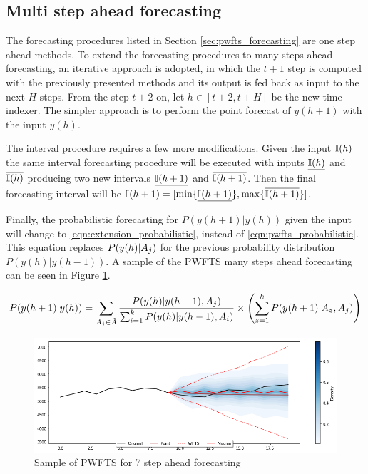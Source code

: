 \subsection{Multi step ahead forecasting}
\label{sec:pwfts_multi_step}

The forecasting procedures listed in Section \ref{sec:pwfts_forecasting} are one step ahead methods. To extend the forecasting procedures to many steps ahead forecasting, an iterative approach is adopted, in which the $t+1$ step is computed with the previously presented methods and its output is fed back as input to the next $H$ steps. From the step $t+2$ on, let $h \in [t+2, t+H]$ be the new time indexer. The simpler approach is to perform the point forecast of $y(h+1)$  with the input $y(h)$.

The interval procedure requires a few more modifications. Given the input $\mathbb{I}(h)$ the same interval forecasting procedure will be executed with inputs $\underline{\mathbb{I}(h)}$ and $\overline{\mathbb{I}(h)}$ producing two new intervals $\underline{\mathbb{I}(h+1)}$ and $\overline{\mathbb{I}(h+1)}$. Then the final forecasting interval will be $\mathbb{I}(h+1) = [\min\{\underline{\mathbb{I}(h+1)}\}, \max\{\overline{\mathbb{I}(h+1)}\}]$. 

Finally, the probabilistic forecasting for $P(y(h+1)|y(h))$ given the input will change to  \ref{eqn:extension_probabilistic}, instead of \ref{eqn:pwfts_probabilistic}. This equation replaces $P(y(h) | A_j)$ for the previous probability distribution $P(y(h)|y(h-1))$. A sample of the PWFTS many steps ahead forecasting can be seen in Figure \ref{fig:pwfts_sample_manystep}.


\begin{equation}
P(y(h+1) | y(h))  = \displaystyle \sum_{A_j \in \tilde{A}} \frac{ P(y(h)| y(h-1), A_j)}{ \sum_{i = 1}^k P(y(h)| y(h-1), A_i)} \times  \left(  \sum_{z = 1}^k  P(y(h+1) | A_z,A_j) \right)
\label{eqn:extension_probabilistic}
\end{equation}
 
\begin{figure}[htb]
    \centering
    \includegraphics[width=\textwidth]{figures/pwfts_sample_manystep.png}
    \caption{Sample of PWFTS for 7 step ahead forecasting}
    \label{fig:pwfts_sample_manystep}
\end{figure}

